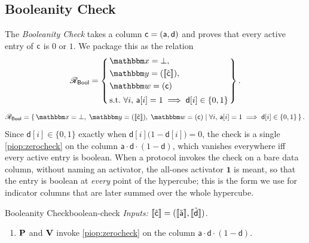 \subsection{Booleanity Check}
The \emph{Booleanity Check} takes a column $\mathsf{c} = (\mathsf{a},\mathsf{d})$ and proves that every active entry of $\mathsf{c}$ is $0$ or $1$. We package this as the relation
\ifsp
\begin{displaymath}
\NPRelation_{\mathsf{Bool}} = \left\{\,
  \begin{aligned}
    & \NPInstance = \bot,\\
    & \NPInstancey = (\Oracle{\hat{\col}}),\\
    & \NPWitness = (\col)\\[2pt]
    & \text{s.t.}\ \forall i,\, \mathsf{a}[i] = 1 \implies \mathsf{d}[i]\in\{0,1\}
  \end{aligned}
\,\right\}.
\end{displaymath}
\else
\begin{displaymath}
\NPRelation_{\mathsf{Bool}} = \left\{\,
  \NPInstance = \bot,\;
  \NPInstancey = (\Oracle{\hat{\col}}),\;
  \NPWitness = (\col)
  \;\middle|\;
    \forall i,\, \mathsf{a}[i] = 1 \implies \mathsf{d}[i]\in\{0,1\}
\,\right\}.
\end{displaymath}
\fi
Since $\mathsf{d}[i]\in\{0,1\}$ exactly when $\mathsf{d}[i]\bigl(1-\mathsf{d}[i]\bigr)=0$, the check is a single \cref{piop:zerocheck} on the column $\mathsf{a}\cdot\mathsf{d}\cdot(1-\mathsf{d})$, which vanishes everywhere iff every active entry is boolean. When a protocol invokes the check on a bare data column, without naming an activator, the all-ones activator $\mathbf{1}$ is meant, so that the entry is boolean at \emph{every} point of the hypercube; this is the form we use for indicator columns that are later summed over the whole hypercube.
\begin{DefinePIOP}{Booleanity Check}{boolean-check}
  \emph{Inputs:} $\llbracket\hat{\mathsf{c}}\rrbracket = (\llbracket\tilde{\mathsf{a}}\rrbracket, \llbracket\tilde{\mathsf{d}}\rrbracket)$.
  \begin{enumerate}[nosep]
    \item $\bf{P}$ and $\bf{V}$ invoke \cref{piop:zerocheck} on the column $\mathsf{a}\cdot\mathsf{d}\cdot(1-\mathsf{d})$.
  \end{enumerate}
\end{DefinePIOP}

